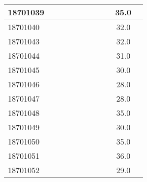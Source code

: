 \documentclass[12pt]{article}
\begin{document}
\begin{center}
\begin{small}
\begin{tabular}{|l|c|c|c|c|c|c|c|c|c|c|}
18701039 &  &  &  &  &  &  &  &  & 35.0\\ \hline 
18701040 &  &  &  &  &  &  &  &  & 32.0\\ \hline 
18701043 &  &  &  &  &  &  &  &  & 32.0\\ \hline 
18701044 &  &  &  &  &  &  &  &  & 31.0\\ \hline 
18701045 &  &  &  &  &  &  &  &  & 30.0\\ \hline 
18701046 &  &  &  &  &  &  &  &  & 28.0\\ \hline 
18701047 &  &  &  &  &  &  &  &  & 28.0\\ \hline 
18701048 &  &  &  &  &  &  &  &  & 35.0\\ \hline 
18701049 &  &  &  &  &  &  &  &  & 30.0\\ \hline 
18701050 &  &  &  &  &  &  &  &  & 35.0\\ \hline 
18701051 &  &  &  &  &  &  &  &  & 36.0\\ \hline 
18701052 &  &  &  &  &  &  &  &  & 29.0\\ \hline 
        \end{tabular}
            \end{small}
            \end{center}
  \centering
            
\end{document}
